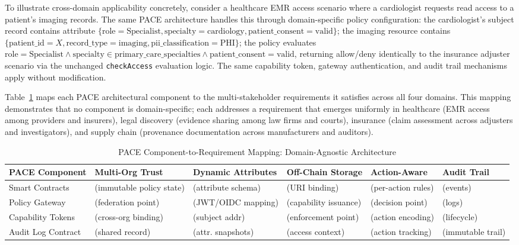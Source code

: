 \documentclass[pdflatex,sn-mathphys-num]{sn-jnl}
\newcommand{\cmark}{\ding{51}}
\begin{document}
To illustrate cross-domain applicability concretely, consider a healthcare EMR access scenario where a cardiologist requests read access to a patient's imaging records. The same PACE architecture handles this through domain-specific policy configuration: the cardiologist's subject record contains attribute $\{\text{role}=\text{Specialist}, \text{specialty}=\text{cardiology}, \text{patient\_consent}=\text{valid}\}$; the imaging resource contains $\{\text{patient\_id}=X, \text{record\_type}=\text{imaging}, \text{pii\_classification}=\text{PHI}\}$; the policy evaluates $\text{role}=\text{Specialist} \land \text{specialty} \in \text{primary\_care\_specialties} \land \text{patient\_consent}=\text{valid}$, returning allow/deny identically to the insurance adjuster scenario via the unchanged \texttt{checkAccess} evaluation logic. The same capability token, gateway authentication, and audit trail mechanisms apply without modification.

Table~\ref{tab:domain-mapping} maps each PACE architectural component to the multi-stakeholder requirements it satisfies across all four domains. This mapping demonstrates that no component is domain-specific; each addresses a requirement that emerges uniformly in healthcare (EMR access among providers and insurers), legal discovery (evidence sharing among law firms and courts), insurance (claim assessment across adjusters and investigators), and supply chain (provenance documentation across manufacturers and auditors).

\begin{table}[!htbp]
	\centering
	\caption{PACE Component-to-Requirement Mapping: Domain-Agnostic Architecture}\label{tab:domain-mapping}
	\scriptsize
	\begin{tabularx}{\textwidth}{@{}l X X X X X@{}}
		\toprule
		\textbf{PACE Component} & \textbf{Multi-Org Trust} & \textbf{Dynamic Attributes} & \textbf{Off-Chain Storage} & \textbf{Action-Aware} & \textbf{Audit Trail} \\
		\midrule
		Smart Contracts & \cmark (immutable policy state) & \cmark (attribute schema) & \cmark (URI binding) & \cmark (per-action rules) & \cmark (events) \\
		\midrule
		Policy Gateway & \cmark (federation point) & \cmark (JWT/OIDC mapping) & \cmark (capability issuance) & \cmark (decision point) & \cmark (logs) \\
		\midrule
		Capability Tokens & \cmark (cross-org binding) & \cmark (subject addr) & \cmark (enforcement point) & \cmark (action encoding) & \cmark (lifecycle) \\
		\midrule
		Audit Log Contract & \cmark (shared record) & \cmark (attr. snapshots) & \cmark (access context) & \cmark (action tracking) & \cmark (immutable trail) \\
		\bottomrule
	\end{tabularx}
	\end{table}
\end{document}
